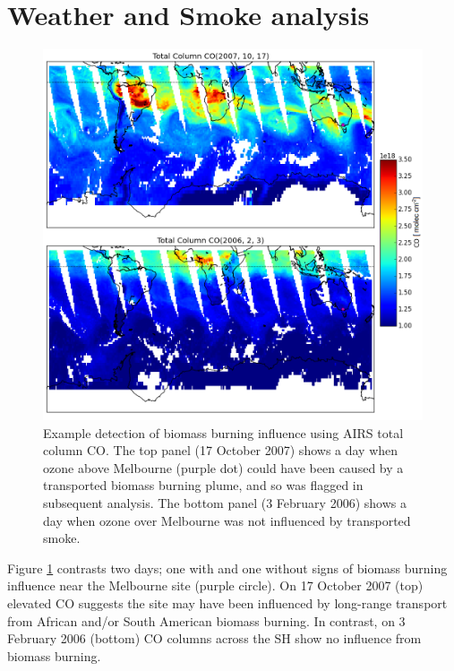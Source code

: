 
\section{Weather and Smoke analysis}
  \label{sec:WeatherSmoke}
  
  \begin{figure}[t]
      \includegraphics[width=12cm]{../figures/AIRS_compare.png}
      \caption{ %
	Example detection of biomass burning influence using AIRS total column CO. 
	The top panel (17 October 2007) shows a day when ozone above Melbourne (purple dot) could have been caused by a transported biomass burning plume, and so was flagged in subsequent analysis.
	The bottom panel (3 February 2006) shows a day when ozone over Melbourne was not influenced by transported smoke.}
      \label{fig:excludedeg}
    \end{figure}

    Figure \ref{fig:excludedeg} contrasts two days; one with and one without signs of biomass burning influence near the Melbourne site (purple circle).
    On 17 October 2007 (top) elevated CO suggests the site may have been influenced by long-range transport from African and/or South American biomass burning.
    In contrast, on 3 February 2006 (bottom) CO columns across the SH show no influence from biomass burning.
    

